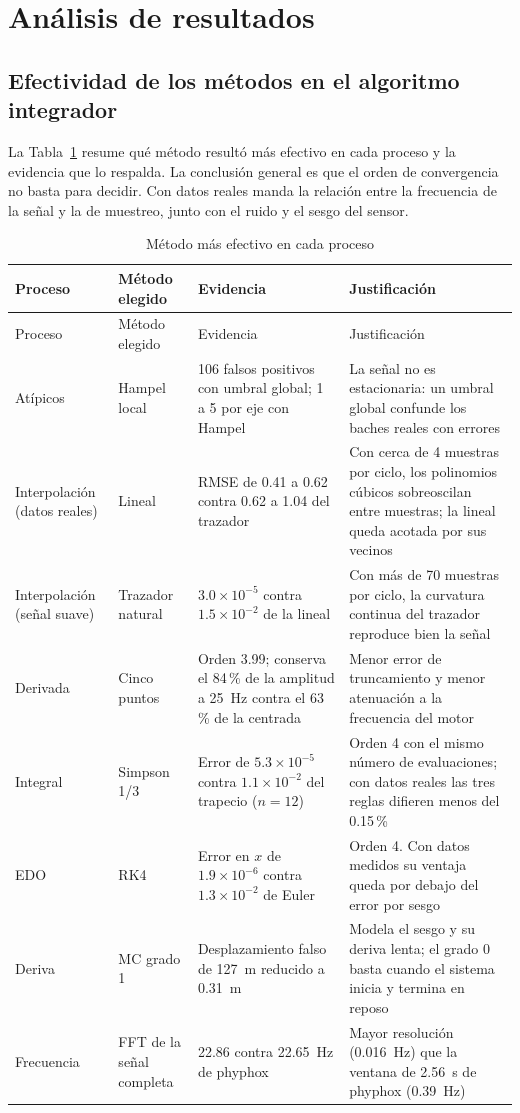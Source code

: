 \section{Análisis de resultados}
\label{sec:analisis}

\subsection{Efectividad de los métodos en el algoritmo integrador}

La Tabla~\ref{tab:efectividad} resume qué método resultó más efectivo en cada proceso y la evidencia que lo respalda. La conclusión general es que el orden de convergencia no basta para decidir. Con datos reales manda la relación entre la frecuencia de la señal y la de muestreo, junto con el ruido y el sesgo del sensor.

\begin{longtable}{@{}p{2.4cm}p{3.2cm}p{4.3cm}p{4.3cm}@{}}
\caption{Método más efectivo en cada proceso}\label{tab:efectividad}\\
\toprule
Proceso & Método elegido & Evidencia & Justificación \\
\midrule
\endfirsthead
\toprule
Proceso & Método elegido & Evidencia & Justificación \\
\midrule
\endhead
\bottomrule
\endfoot
Atípicos & Hampel local & 106 falsos positivos con umbral global; 1 a 5 por eje con Hampel & La señal no es estacionaria: un umbral global confunde los baches reales con errores \\
Interpolación (datos reales) & Lineal & RMSE de 0.41 a 0.62 contra 0.62 a 1.04 del trazador & Con cerca de 4 muestras por ciclo, los polinomios cúbicos sobreoscilan entre muestras; la lineal queda acotada por sus vecinos \\
Interpolación (señal suave) & Trazador natural & $3.0\times10^{-5}$ contra $1.5\times10^{-2}$ de la lineal & Con más de 70 muestras por ciclo, la curvatura continua del trazador reproduce bien la señal \\
Derivada & Cinco puntos & Orden 3.99; conserva el 84\,\% de la amplitud a 25~Hz contra el 63\,\% de la centrada & Menor error de truncamiento y menor atenuación a la frecuencia del motor \\
Integral & Simpson 1/3 & Error de $5.3\times10^{-5}$ contra $1.1\times10^{-2}$ del trapecio ($n = 12$) & Orden 4 con el mismo número de evaluaciones; con datos reales las tres reglas difieren menos del 0.15\,\% \\
EDO & RK4 & Error en $x$ de $1.9\times10^{-6}$ contra $1.3\times10^{-2}$ de Euler & Orden 4. Con datos medidos su ventaja queda por debajo del error por sesgo \\
Deriva & MC grado 1 & Desplazamiento falso de 127~m reducido a 0.31~m & Modela el sesgo y su deriva lenta; el grado 0 basta cuando el sistema inicia y termina en reposo \\
Frecuencia & FFT de la señal completa & 22.86 contra 22.65~Hz de phyphox & Mayor resolución (0.016~Hz) que la ventana de 2.56~s de phyphox (0.39~Hz) \\
\end{longtable}


